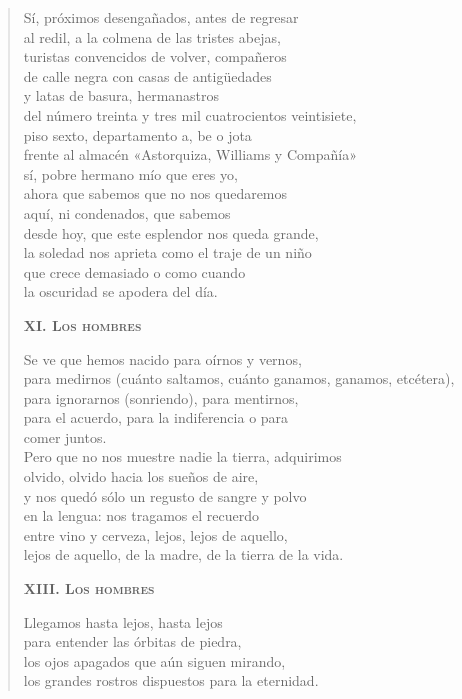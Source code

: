 \documentclass[12pt]{article}
\begin{document}
\begin{verse}
Sí, próximos desengañados, antes de regresar\\
al redil, a la colmena de las tristes abejas,\\
turistas convencidos de volver, compañeros\\
de calle negra con casas de antigüedades\\
y latas de basura, hermanastros\\
del número treinta y tres mil cuatrocientos veintisiete,\\
piso sexto, departamento a, be o jota\\
frente al almacén «Astorquiza, Williams y Compañía»\\
sí, pobre hermano mío que eres yo,\\
ahora que sabemos que no nos quedaremos\\
aquí, ni condenados, que sabemos\\
desde hoy, que este esplendor nos queda grande,\\
la soledad nos aprieta como el traje de un niño\\
que crece demasiado o como cuando\\
la oscuridad se apodera del día.  

{\bfseries\scshape {XI. Los hombres}}

Se ve que hemos nacido para oírnos y vernos,\\
para medirnos (cuánto saltamos, cuánto ganamos, ganamos, etcétera),\\
para ignorarnos (sonriendo), para mentirnos,\\
para el acuerdo, para la indiferencia o para\\
comer juntos.\\
Pero que no nos muestre nadie la tierra, adquirimos\\
olvido, olvido hacia los sueños de aire,\\
y nos quedó sólo un regusto de sangre y polvo\\
en la lengua: nos tragamos el recuerdo\\
entre vino y cerveza, lejos, lejos de aquello,\\
lejos de aquello, de la madre, de la tierra de la vida.  

{\bfseries\scshape {XIII. Los hombres}}

Llegamos hasta lejos, hasta lejos\\
para entender las órbitas de piedra,\\
los ojos apagados que aún siguen mirando,\\
los grandes rostros dispuestos para la eternidad.  


\end{verse}
\end{document}

